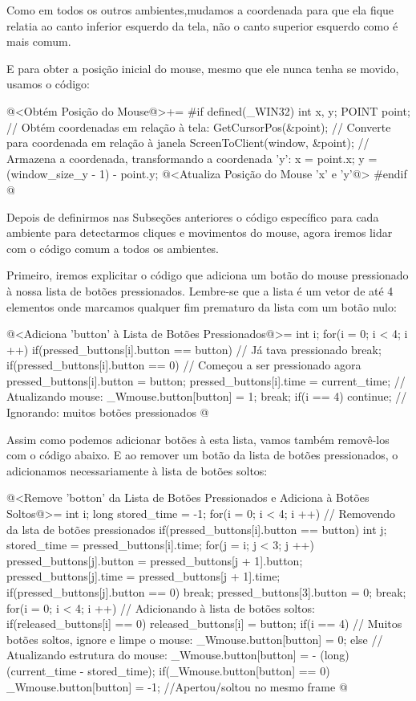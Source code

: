 Como em todos os outros ambientes,mudamos a coordenada para que ela
fique relatia ao canto inferior esquerdo da tela, não o canto superior
esquerdo como é mais comum.

E para obter a posição inicial do mouse, mesmo que ele nunca tenha se
movido, usamos o código:

\iniciocodigo
@<Obtém Posição do Mouse@>+=
#if defined(_WIN32)
{
  int x, y;
  POINT point;
  // Obtém coordenadas em relação à tela:
  GetCursorPos(&point);
  // Converte para coordenada em relação à janela
  ScreenToClient(window, &point);
  // Armazena a coordenada, transformando a coordenada 'y':
  x = point.x;
  y = (window_size_y - 1) - point.y;
  @<Atualiza Posição do Mouse 'x' e 'y'@>
}
#endif
@
\fimcodigo



Depois de definirmos nas Subseções anteriores o código específico para
cada ambiente para detectarmos cliques e movimentos do mouse, agora
iremos lidar com o código comum a todos os ambientes.

Primeiro, iremos explicitar o código que adiciona um botão do mouse
pressionado à nossa lista de botões pressionados. Lembre-se que a
lista é um vetor de até 4 elementos onde marcamos qualquer fim
prematuro da lista com um botão nulo:

\iniciocodigo
@<Adiciona 'button' à Lista de Botões Pressionados@>=
{
  int i;
  for(i = 0; i < 4; i ++){
    if(pressed_buttons[i].button == button) // Já tava pressionado
      break;
    if(pressed_buttons[i].button == 0){ // Começou a ser pressionado agora
      pressed_buttons[i].button = button;
      pressed_buttons[i].time = current_time;
      // Atualizando mouse:
      _Wmouse.button[button] = 1;
      break;
    }
  }
  if(i == 4) continue; // Ignorando: muitos botões pressionados
}
@
\fimcodigo

Assim como podemos adicionar botões à esta lista, vamos também
removê-los com o código abaixo. E ao remover um botão da lista de
botões pressionados, o adicionamos necessariamente à lista de botões
soltos:

\iniciocodigo
@<Remove 'botton' da Lista de Botões Pressionados e Adiciona à Botões Soltos@>=
{
  int i;
  long stored_time = -1;
  for(i = 0; i < 4; i ++){ // Removendo da lsta de botões pressionados
    if(pressed_buttons[i].button == button){
      int j;
      stored_time = pressed_buttons[i].time;
      for(j = i; j < 3; j ++){
        pressed_buttons[j].button = pressed_buttons[j + 1].button;
        pressed_buttons[j].time = pressed_buttons[j + 1].time;
        if(pressed_buttons[j].button == 0)
          break;
      }
      pressed_buttons[3].button = 0;
      break;
    }
  }
  for(i = 0; i < 4; i ++){ // Adicionando à lista de botões soltos:
    if(released_buttons[i] == 0)
      released_buttons[i] = button;
  }
  if(i == 4) // Muitos botões soltos, ignore e limpe o mouse:
    _Wmouse.button[button] = 0;
  else{
    // Atualizando estrutura do mouse:
    _Wmouse.button[button] = - (long) (current_time - stored_time);
    if(_Wmouse.button[button] == 0)
      _Wmouse.button[button] = -1; //Apertou/soltou no mesmo frame
  }
}
@
\fimcodigo

